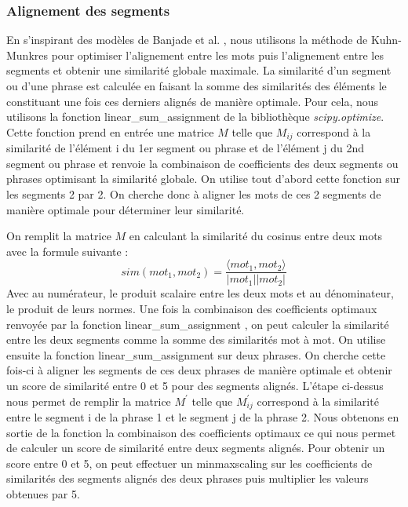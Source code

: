 \documentclass[a4paper, twoside, 11pt]{article}
\begin{document}
\subsubsection{Alignement des segments}

En s’inspirant des modèles de Banjade et al. \cite{banjade}  \cite{banjadeautre}, nous utilisons la méthode de Kuhn-Munkres pour optimiser l’alignement entre les mots puis l’alignement entre les segments et obtenir une similarité globale maximale. La similarité d’un segment ou d’une phrase est calculée en faisant la somme des similarités des éléments le constituant une fois ces derniers alignés de manière optimale. Pour cela, nous utilisons la fonction \og linear\_sum\_assignment \fg{} de la bibliothèque \textit{scipy.optimize}. Cette fonction prend en entrée une matrice $M$ telle que $M_{ij}$ correspond à la similarité de l’élément i du 1er segment ou phrase et de l’élément j du 2nd segment ou phrase et renvoie la combinaison de coefficients des deux segments ou phrases optimisant la similarité globale. On utilise tout d’abord cette fonction sur les segments 2 par 2. On cherche donc à aligner les mots de ces 2 segments de manière optimale pour déterminer leur similarité.

 On remplit la matrice $M$ en calculant la similarité du cosinus entre deux mots avec la formule suivante :
 \begin{equation}
    sim(mot_{1}, mot_{2})=\frac{\langle mot_{1}, mot_{2}\rangle}{|mot_{1}||mot_{2}|}
 \end{equation}
 Avec au numérateur, le produit scalaire entre les deux mots et au dénominateur, le produit de leurs normes. Une fois la combinaison des coefficients optimaux renvoyée par la fonction \og linear\_sum\_assignment \fg{}, on peut calculer la similarité entre les deux segments comme la somme des similarités mot à mot. On utilise ensuite la fonction \og linear\_sum\_assignment \fg{} sur deux phrases. On cherche cette fois-ci à aligner les segments de ces deux phrases de manière optimale et obtenir un score de similarité entre 0 et 5 pour des segments alignés. L’étape ci-dessus nous permet de remplir la matrice $M^{\prime}$ telle que $M^{\prime}_{ij}$ correspond à la similarité entre le segment i de la phrase 1 et le segment j de la phrase 2. Nous obtenons en sortie de la fonction la combinaison des coefficients optimaux ce qui nous permet de calculer un score de similarité entre deux segments alignés. Pour obtenir un score entre 0 et 5, on peut effectuer un \og minmaxscaling \fg{} sur les coefficients de similarités des segments alignés des deux phrases puis multiplier les valeurs obtenues par 5.
\end{document}
